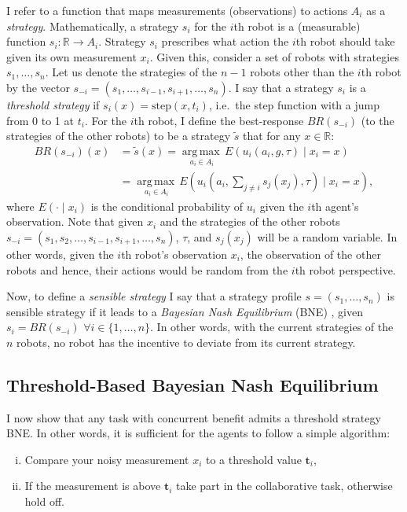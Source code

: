 \documentclass[defaultstyle,12pt]{thesis}
\DeclareMathOperator*{\argmaxop}{arg\,max\,}
\newcommand{\argmax}[1]{\underset{#1}{\argmaxop}}
\newcommand{\R}{\mathbb{R}}    %
\newcommand{\td}{\mathbf{t}}   %
\begin{document}
I refer to a function that maps measurements (observations) to actions $A_i$ as a \emph{strategy}. Mathematically, a strategy $s_i$ for the $i$th robot is a (measurable) function $s_i:\R\to A_i$. Strategy $s_i$ prescribes what action the $i$th robot should take given its own measurement $x_i$. Given this, consider a set of robots with strategies $s_1,\ldots,s_n$. Let us denote the strategies of the $n-1$ robots other than the $i$th robot by the vector $s_{-i}=(s_1,\ldots,s_{i-1},s_{i+1},\ldots,s_n)$.  I say that a strategy $s_i$ is a \emph{threshold strategy} if $s_i(x)=\text{step}(x, t_i)$, i.e.\ the step function with a jump from 0 to 1 at $t_i$. For the $i$th robot, I define the best-response $BR(s_{-i})$ (to the strategies of the other robots) to be a strategy $\tilde{s}$ that for any $x\in \R$:
\begin{align*}\label{eqn:BR}
BR(s_{-i})(x)&=\tilde{s}(x)=\argmax{a_i\in A_i} E(u_i(a_i,g,\tau)\mid x_i=x)\\
&=\argmax{a_i\in A_i} E(u_i(a_i,\sum_{j\not=i}s_j(x_j),\tau)\mid x_i=x),
\end{align*}
where $E(\cdot \mid x_i)$ is the conditional probability of $u_i$ given the $i$th agent's observation. Note that given $x_i$ and the strategies of the other robots $s_{-i}=(s_1,s_2,\ldots,s_{i-1},s_{i+1},\ldots,s_n)$, $\tau$, and $s_j(x_j)$ will be a random variable. In other words, given the $i$th robot's observation $x_i$, the observation of the other robots and hence, their actions would be random from the $i$th robot perspective.

Now, to define a \emph{sensible strategy} I say that a strategy profile $s=(s_1,\ldots,s_n)$ is sensible strategy if it leads to a \emph{Bayesian Nash Equilibrium} (BNE) \cite{Fudenberg1998}, given $s_i=BR(s_{-i})$ $\forall i\in \{1,\ldots,n\}$. In other words, with the current strategies of the $n$ robots, no robot has the incentive to deviate from its current strategy.

\subsection{Threshold-Based Bayesian Nash Equilibrium}\label{subsec:thmproof}
I now show that any task with concurrent benefit admits a threshold strategy BNE. In other words, it is sufficient for the agents to follow a simple algorithm: 
\begin{enumerate}[(i)]
\item Compare your noisy measurement $x_i$ to a threshold value $\td_i$,
\item If the measurement is above $\td_i$ take part in the collaborative task, otherwise hold off. 
\end{enumerate}
\end{document}
